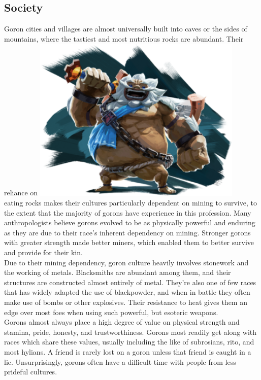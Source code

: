 \documentclass[10pt,twoside,twocolumn,openany]{book}
\begin{document}
\subsection{Society}
Goron cities and villages are almost universally built into caves or the sides of mountains, where the tastiest and most nutritious rocks are abundant. Their reliance on 
\includegraphics[width=100mm,scale=0.5]{daruk.png} \\
eating rocks makes their cultures particularly dependent on mining to survive, to the extent that the majority of gorons have experience in this profession. Many anthropologists believe gorons evolved to be as physically powerful and enduring as they are due to their race's inherent dependency on mining. Stronger gorons with greater strength made better miners, which enabled them to better survive and provide for their kin.\\
Due to their mining dependency, goron culture heavily involves stonework and the working of metals. Blacksmiths are abundant among them, and their structures are constructed almost entirely of metal. They're also one of few races that has widely adapted the use of blackpowder, and when in battle they often make use of bombs or other explosives. Their resistance to heat gives them an edge over most foes when using such powerful, but esoteric weapons.\\
Gorons almost always place a high degree of value on physical strength and stamina, pride, honesty, and trustworthiness. Gorons most readily get along with races which share these values, usually including the like of subrosians, rito, and most hylians. A friend is rarely lost on a goron unless that friend is caught in a lie. Unsurprisingly, gorons often have a difficult time with people from less prideful cultures.
\end{document}
